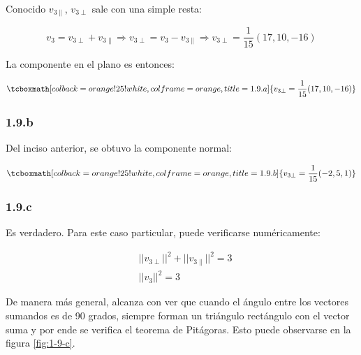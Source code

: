 \documentclass{article}
\begin{document}
Conocido $v_{3\parallel}$, $v_{3\perp}$ sale con una simple resta:

\begin{equation}
v_3 = v_{3\perp} + v_{3\parallel} \Rightarrow v_{3\perp} = v_3 - v_{3\parallel} \Rightarrow v_{3\perp} = \frac{1}{15} (17, 10, -16)
\end{equation}

La componente en el plano es entonces:

\begin{equation}
\tcboxmath[colback=orange!25!white,colframe=orange,title=1.9.a]
{ v_{3\perp} = \frac{1}{15} (17, 10, -16) }
\end{equation}

\subsubsection*{1.9.b}
\label{subsubsec:1.9.b}

Del inciso anterior, se obtuvo la componente normal:

\begin{equation}
\tcboxmath[colback=orange!25!white,colframe=orange,title=1.9.b]
{ v_{3\perp} = \frac{1}{15} (-2, 5, 1) }
\end{equation}

\subsubsection*{1.9.c}
\label{subsubsec:1.9.c}

Es verdadero. Para este caso particular, puede verificarse numéricamente:

\begin{subequations}
\begin{align}
& ||v_{3\perp}||^2 + ||v_{3\parallel}||^2 = 3 \\
& ||v_3||^2 = 3
\end{align}
\end{subequations}

De manera más general, alcanza con ver que cuando el ángulo entre los vectores sumandos es de 90 grados, siempre forman un triángulo rectángulo con el vector suma y por ende se verifica el teorema de Pitágoras. Esto puede observarse en la figura \ref{fig:1-9-c}.
\end{document}
